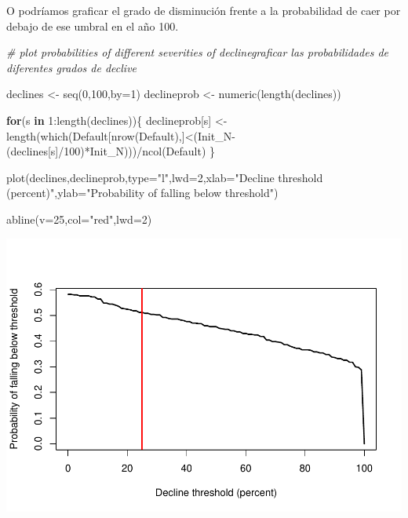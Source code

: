 \documentclass[
]{article}
\newenvironment{Shaded}{\begin{snugshade}}{\end{snugshade}}
\newcommand{\AttributeTok}[1]{\textcolor[rgb]{0.77,0.63,0.00}{#1}}
\newcommand{\CommentTok}[1]{\textcolor[rgb]{0.56,0.35,0.01}{\textit{#1}}}
\newcommand{\ControlFlowTok}[1]{\textcolor[rgb]{0.13,0.29,0.53}{\textbf{#1}}}
\newcommand{\DecValTok}[1]{\textcolor[rgb]{0.00,0.00,0.81}{#1}}
\newcommand{\FunctionTok}[1]{\textcolor[rgb]{0.00,0.00,0.00}{#1}}
\newcommand{\NormalTok}[1]{#1}
\newcommand{\OtherTok}[1]{\textcolor[rgb]{0.56,0.35,0.01}{#1}}
\newcommand{\SpecialCharTok}[1]{\textcolor[rgb]{0.00,0.00,0.00}{#1}}
\newcommand{\StringTok}[1]{\textcolor[rgb]{0.31,0.60,0.02}{#1}}
\begin{document}
O podríamos graficar el grado de disminución frente a la probabilidad de
caer por debajo de ese umbral en el año 100.

\begin{Shaded}
\begin{Highlighting}[]
\CommentTok{\# plot probabilities of different severities of declinegraficar las probabilidades de diferentes grados de declive}

\NormalTok{declines }\OtherTok{\textless{}{-}} \FunctionTok{seq}\NormalTok{(}\DecValTok{0}\NormalTok{,}\DecValTok{100}\NormalTok{,}\AttributeTok{by=}\DecValTok{1}\NormalTok{)}
\NormalTok{declineprob }\OtherTok{\textless{}{-}} \FunctionTok{numeric}\NormalTok{(}\FunctionTok{length}\NormalTok{(declines))}

\ControlFlowTok{for}\NormalTok{(s }\ControlFlowTok{in} \DecValTok{1}\SpecialCharTok{:}\FunctionTok{length}\NormalTok{(declines))\{}
\NormalTok{  declineprob[s] }\OtherTok{\textless{}{-}} \FunctionTok{length}\NormalTok{(}\FunctionTok{which}\NormalTok{(Default[}\FunctionTok{nrow}\NormalTok{(Default),]}\SpecialCharTok{\textless{}}\NormalTok{(Init\_N}\SpecialCharTok{{-}}\NormalTok{(declines[s]}\SpecialCharTok{/}\DecValTok{100}\NormalTok{)}\SpecialCharTok{*}\NormalTok{Init\_N)))}\SpecialCharTok{/}\FunctionTok{ncol}\NormalTok{(Default)}
\NormalTok{\}}

\FunctionTok{plot}\NormalTok{(declines,declineprob,}\AttributeTok{type=}\StringTok{"l"}\NormalTok{,}\AttributeTok{lwd=}\DecValTok{2}\NormalTok{,}\AttributeTok{xlab=}\StringTok{"Decline threshold (percent)"}\NormalTok{,}\AttributeTok{ylab=}\StringTok{"Probability of falling below threshold"}\NormalTok{)}

\FunctionTok{abline}\NormalTok{(}\AttributeTok{v=}\DecValTok{25}\NormalTok{,}\AttributeTok{col=}\StringTok{"red"}\NormalTok{,}\AttributeTok{lwd=}\DecValTok{2}\NormalTok{)}
\end{Highlighting}
\end{Shaded}

\includegraphics{LECTURE12_files/figure-latex/unnamed-chunk-7-1.pdf}
\end{document}
